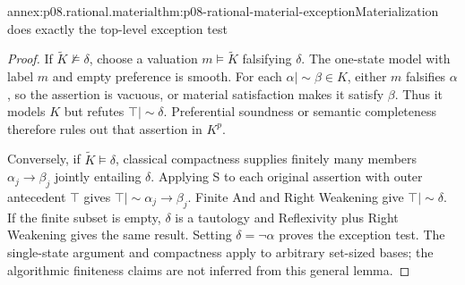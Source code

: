 \begin{annexitem}{annex:p08.rational.material}{thm:p08-rational-material-exception}{Materialization does exactly the top-level exception test}
\begin{proof}
If \(\widetilde K\not\models\delta\), choose a valuation
\(m\models\widetilde K\) falsifying \(\delta\).
The one-state model with label \(m\) and empty preference is smooth.
For each \(\alpha\mathrel{|\!\sim}\beta\in K\), either
\(m\) falsifies \(\alpha\), so the assertion is vacuous, or
material satisfaction makes it satisfy \(\beta\). Thus it models
\(K\) but refutes \(\top\mathrel{|\!\sim}\delta\).
Preferential soundness or semantic completeness therefore rules out
that assertion in \(K^p\).

Conversely, if \(\widetilde K\models\delta\), classical compactness
supplies finitely many members \(\alpha_j\to\beta_j\) jointly
entailing \(\delta\). Applying S to each original assertion with
outer antecedent \(\top\) gives
\(\top\mathrel{|\!\sim}\alpha_j\to\beta_j\).
Finite And and Right Weakening give
\(\top\mathrel{|\!\sim}\delta\).
If the finite subset is empty, \(\delta\) is a tautology and
Reflexivity plus Right Weakening gives the same result. Setting
\(\delta=\neg\alpha\) proves the exception test. The single-state
argument and compactness apply to arbitrary set-sized bases; the
algorithmic finiteness claims are not inferred from this general lemma.
\end{proof}
\end{annexitem}

